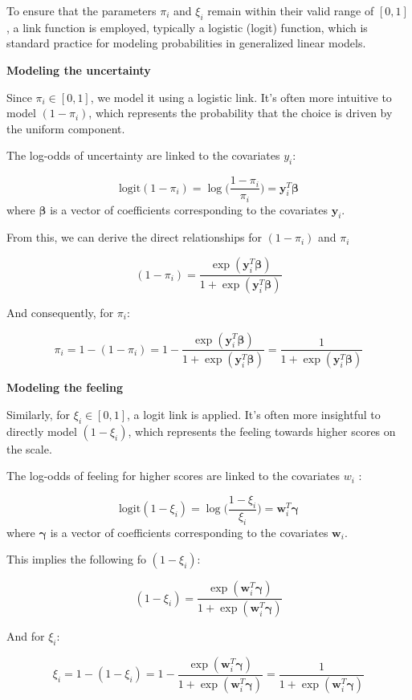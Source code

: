 \documentclass[
  letterpaper,
  DIV=11,
  numbers=noendperiod]{scrartcl}
\begin{document}
To ensure that the parameters \(\pi_i\) and \(\xi_i\) remain within
their valid range of \([0,1]\), a link function is employed, typically a
logistic (logit) function, which is standard practice for modeling
probabilities in generalized linear models.

\textbf{Modeling the uncertainty}

Since \(\pi_i\in [0,1]\), we model it using a logistic link. It's often
more intuitive to model \((1-\pi_i)\), which represents the probability
that the choice is driven by the uniform component.

The log-odds of uncertainty are linked to the covariates \(y_i\):

\[
\text{logit}(1-\pi_i) = \log \Bigg(\frac{1-\pi_i}{\pi_i}\Bigg) = \boldsymbol{y}^{T}_i\boldsymbol{\beta}
\] where \(\boldsymbol{\beta}\) is a vector of coefficients
corresponding to the covariates \(\boldsymbol{y}_i\).

From this, we can derive the direct relationships for \((1−\pi_i)\) and
\(\pi_i\)

\[
(1-\pi_i)=\frac{\exp(\boldsymbol{y}^{T}_i\boldsymbol{\beta})}{1+\exp(\boldsymbol{y}^{T}_i\boldsymbol{\beta})}
\]

And consequently, for \(\pi_i\):

\[
\pi_i = 1-(1-\pi_i) = 1- \frac{\exp(\boldsymbol{y}^{T}_i\boldsymbol{\beta})}{1+\exp(\boldsymbol{y}^{T}_i\boldsymbol{\beta})} = \frac{1}{1+\exp(\boldsymbol{y}^{T}_i\boldsymbol{\beta})}
\]

\textbf{Modeling the feeling}

Similarly, for \(\xi_i\in [0,1]\), a logit link is applied. It's often
more insightful to directly model \((1-\xi_i)\), which represents the
feeling towards higher scores on the scale.

The log-odds of feeling for higher scores are linked to the covariates
\(w_i\) :

\[
\text{logit}(1-\xi_i) = \log \Bigg(\frac{1-\xi_i}{\xi_i}\Bigg) = \boldsymbol{w}^{T}_i\boldsymbol{\gamma}
\] where \(\boldsymbol{\gamma}\) is a vector of coefficients
corresponding to the covariates \(\boldsymbol{w}_i\).

This implies the following fo \((1−\xi_i)\):

\[
(1-\xi_i)=\frac{\exp(\boldsymbol{w}^{T}_i\boldsymbol{\gamma})}{1+\exp(\boldsymbol{w}^{T}_i\boldsymbol{\gamma})}
\]

And for \(\xi_i\):

\[
\xi_i = 1-(1-\xi_i) = 1- \frac{\exp(\boldsymbol{w}^{T}_i\boldsymbol{\gamma})}{1+\exp(\boldsymbol{w}^{T}_i\boldsymbol{\gamma})} = \frac{1}{1+\exp(\boldsymbol{w}^{T}_i\boldsymbol{\gamma})}
\]
\end{document}
